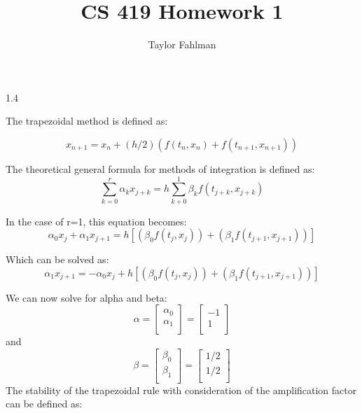 \documentclass{article}
\begin{document}
\title{CS 419 Homework 1}
\author{Taylor Fahlman}
\maketitle
\begin{flushleft}
1.4\\
\end{flushleft}


The trapezoidal method is defined as:

\begin{equation}
    x_{n+1} = x_{n} + (h/2)(f(t_n, x_n) + f(t_{n+1}, x_{n+1}))
\end{equation}

The theoretical general formula for methods of integration is defined as:
\begin{equation}
    \sum_{k=0}^r \alpha_k x_{j+k} = h \sum_{k+0}^1 \beta_k f(t_{j+k},x_{j+k}) 
\end{equation}

In the case of r=1, this equation becomes:
\begin{equation}
    \alpha_0 x_j + \alpha_1 x_{j+1} = h[(\beta_0 f(t_j, x_j)) + (\beta_1f(t_{j+1},x_{j+1}))]
\end{equation}

Which can be solved as:
\begin{equation}
    \alpha_1 x_{j+1} = -\alpha_0 x_j + h[(\beta_0 f(t_j, x_j)) + (\beta_1f(t_{j+1},x_{j+1}))]
\end{equation}

We can now solve for alpha and beta:
\begin{equation}
\alpha = \begin{bmatrix}
    \alpha_0\\
    \alpha_1\\
\end{bmatrix} =\begin{bmatrix}
    -1\\
    1\\
\end{bmatrix}
\end{equation}
and
\begin{equation}
\beta = \begin{bmatrix}
    \beta_0\\
    \beta_1\\
\end{bmatrix} =\begin{bmatrix}
    1/2\\
    1/2\\
\end{bmatrix}
\end{equation}
The stability of the trapezoidal rule with consideration of the amplification factor can be defined as:
\end{document}
